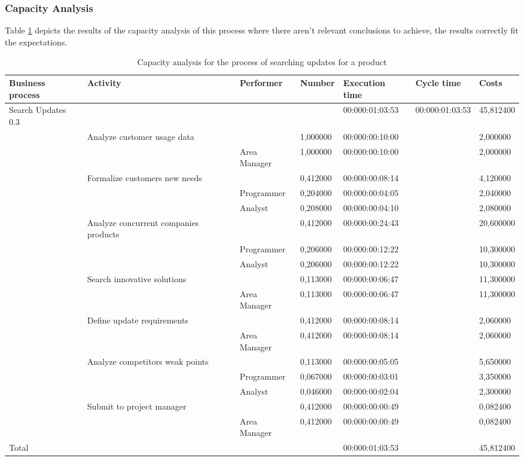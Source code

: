 \subsubsection{Capacity Analysis}
Table \ref{2tab:updates} depicts the results of the capacity analysis of
this process where there aren't relevant conclusions to achieve, the results correctly fit the expectations.
\begin{landscape}
\centering
\begin{table}
{\tiny
\begin{tabular}{|l|l|l|l|l|l|l|}
Business process&Activity&Performer&Number&Execution time&Cycle
time&Costs\\
\hline
Search Updates 0.3&&&&00:000:01:03:53&00:000:01:03:53&45,812400\\
\hline
&Analyze customer usage data &&1,000000&00:000:00:10:00&&2,000000\\
\hline
&&Area Manager &1,000000&00:000:00:10:00&&2,000000\\
\hline
&Formalize customers new needs &&0,412000&00:000:00:08:14&&4,120000\\
\hline
&&Programmer &0,204000&00:000:00:04:05&&2,040000\\
\hline
&&Analyst &0,208000&00:000:00:04:10&&2,080000\\
\hline
&Analyze concurrent companies products &&0,412000&00:000:00:24:43&&20,600000\\
\hline
&&Programmer &0,206000&00:000:00:12:22&&10,300000\\
\hline
&&Analyst &0,206000&00:000:00:12:22&&10,300000\\
\hline
&Search innovative solutions &&0,113000&00:000:00:06:47&&11,300000\\
\hline
&&Area Manager &0,113000&00:000:00:06:47&&11,300000\\
\hline
&Define update requirements  &&0,412000&00:000:00:08:14&&2,060000\\
\hline
&&Area Manager &0,412000&00:000:00:08:14&&2,060000\\
\hline
&Analyze competitors weak points &&0,113000&00:000:00:05:05&&5,650000\\
\hline
&&Programmer &0,067000&00:000:00:03:01&&3,350000\\
\hline
&&Analyst &0,046000&00:000:00:02:04&&2,300000\\
\hline
&Submit to project manager &&0,412000&00:000:00:00:49&&0,082400\\
\hline
&&Area Manager &0,412000&00:000:00:00:49&&0,082400\\
\hline
Total&&&&00:000:01:03:53&&45,812400\\
\hline
\end{tabular}
}
\caption{Capacity analysis for the process of searching updates for a
product} 
\label{2tab:updates}
\end{table}
\end{landscape}



